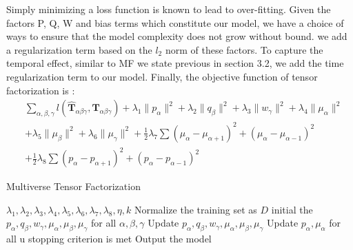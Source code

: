 Simply minimizing a loss function is known to lead to over-fitting.
Given the factors P, Q, W and bias terms which constitute our model, we have a choice of ways to ensure that the model complexity does not grow without bound.
we add a regularization term based on the $l_2$ norm of these
factors.
To capture the temporal effect, similar to MF we state previous in section 3.2, we add the time regularization term to our model.
Finally, the objective function of tensor factorization is :\\
\begin{equation*}
\begin{aligned}
&\sum\limits_{\alpha, \beta, \gamma} l( \hat{\mathbf{T}}_{\alpha\beta\gamma}, \mathbf{T}_{\alpha\beta \gamma} )+\lambda_1\|p_{\alpha}\|^2+\lambda_2\|q_\beta\|^2+\lambda_3\|w_\gamma\|^2+\lambda_4\|
\mu_\alpha\|^2\\
&+\lambda_5\|\mu_\beta\|^2+\lambda_6\|\mu_\gamma\|^2+\frac{1}{2}\lambda_7\sum(\mu_\alpha-\mu_{\alpha+1})^2+(\mu_\alpha-\mu_{\alpha-1})^2
\\&
+\frac{1}{2}\lambda_8\sum(p_\alpha-p_{\alpha+1})^2+(p_\alpha-p_{\alpha-1})^2
\end{aligned}
\end{equation*}

\begin{algorithm}[h]
  \caption{Multiverse Tensor Factorization}
  \label{alg::conjugateGradient}
  \begin{algorithmic}[1]
    \Require
    $\lambda_1,\lambda_2, \lambda_3, \lambda_4, \lambda_5, \lambda_6, \lambda_7, \lambda_8, \eta, k$
    \State Normalize the training set as $D$
    \State initial the $p_\alpha, q_\beta, w_\gamma, \mu_\alpha, \mu_\beta, \mu_\gamma$ for all $\alpha, \beta, \gamma$
    \Repeat
      \State Update $p_\alpha, q_\beta, w_\gamma, \mu_\alpha, \mu_\beta, \mu_\gamma$ 
     \EndFor
     \State Update $p_\alpha,  \mu_\alpha $ for all u
    \Until stopping criterion is met
    \State Output the model 
  \end{algorithmic}
\end{algorithm}

